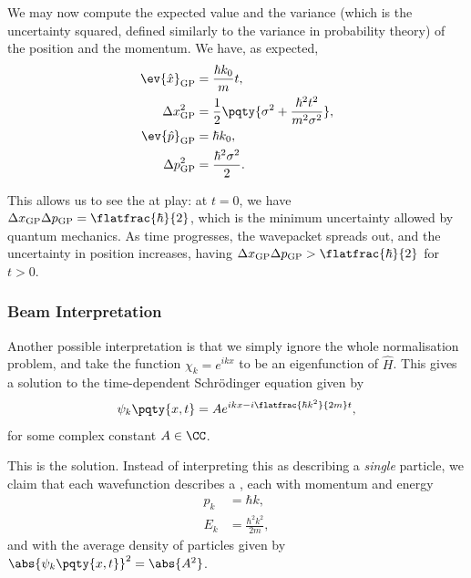 We may now compute the expected value and the variance (which is the uncertainty squared, defined similarly to the variance in probability theory) of the position and the momentum. We have, as expected,
\begin{subequations}
    \begin{align}
        \ev{\hat{x}}_{\text{GP}} &= \frac{\hbar k_0}{m} t, \\
        \Delta x_{\text{GP}}^2 &= \frac{1}{2} \pqty{\sigma^2 + \frac{\hbar^2 t^2}{m^2 \sigma^2}}, \\
        \ev{\hat{p}}_{\text{GP}} &= \hbar k_0, \\
        \Delta p_{\text{GP}}^2 &= \frac{\hbar^2 \sigma^2}{2}.
    \end{align}
\end{subequations}

This allows us to see the  at play: at \(t = 0\), we have \(\Delta x_{\text{GP}} \Delta p_{\text{GP}} = \flatfrac{\hbar}{2}\), which is the minimum uncertainty allowed by quantum mechanics. As time progresses, the wavepacket spreads out, and the uncertainty in position increases, having \(\Delta x_{\text{GP}} \Delta p_{\text{GP}} > \flatfrac{\hbar}{2}\) for \(t > 0\).

\subsubsection{Beam Interpretation}

Another possible interpretation is that we simply ignore the whole normalisation problem, and take the function \(\chi_k = e^{i k x}\) to be an eigenfunction of \(\hat{H}\). This gives a solution to the time-dependent Schr\"{o}dinger equation given by
\begin{equation}
    \psi_k\pqty{x, t} = A e^{i k x - i \flatfrac{\hbar k^2}{2 m} t},
\end{equation}
for some complex constant \(A \in \CC\).

This is the  solution. Instead of interpreting this as describing a \emph{single} particle, we claim that each wavefunction describes a , each with momentum and energy
\begin{subequations}
    \begin{align}
        p_k &= \hbar k, \\
        E_k &= \frac{\hbar^2 k^2}{2 m},
    \end{align}
\end{subequations}
and with the average density of particles given by \(\abs{\psi_k\pqty{x, t}}^2 = \abs{A^2}\).

